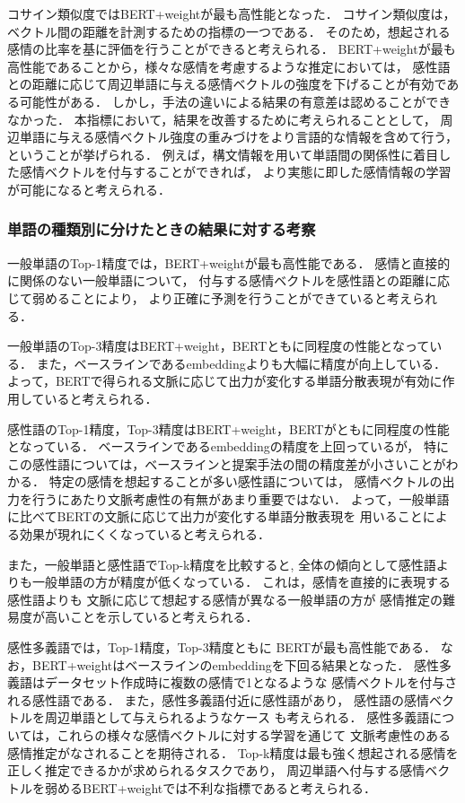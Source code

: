 			コサイン類似度ではBERT+weightが最も高性能となった．
			コサイン類似度は，ベクトル間の距離を計測するための指標の一つである．
			そのため，想起される感情の比率を基に評価を行うことができると考えられる．
			BERT+weightが最も高性能であることから，様々な感情を考慮するような推定においては，
			感性語との距離に応じて周辺単語に与える感情ベクトルの強度を下げることが有効である可能性がある．
			しかし，手法の違いによる結果の有意差は認めることができなかった．
			本指標において，結果を改善するために考えられることとして，
			周辺単語に与える感情ベクトル強度の重みづけをより言語的な情報を含めて行う，
			ということが挙げられる．
			例えば，構文情報を用いて単語間の関係性に着目した感情ベクトルを付与することができれば，
			より実態に即した感情情報の学習が可能になると考えられる．			
			
		\subsubsection{単語の種類別に分けたときの結果に対する考察}
			一般単語のTop-1精度では，BERT+weightが最も高性能である．
			感情と直接的に関係のない一般単語について，
			付与する感情ベクトルを感性語との距離に応じて弱めることにより，
			より正確に予測を行うことができていると考えられる．

			一般単語のTop-3精度はBERT+weight，BERTともに同程度の性能となっている．
			また，ベースラインであるembeddingよりも大幅に精度が向上している．
			よって，BERTで得られる文脈に応じて出力が変化する単語分散表現が有効に作用していると考えられる．

			感性語のTop-1精度，Top-3精度はBERT+weight，BERTがともに同程度の性能となっている．
			ベースラインであるembeddingの精度を上回っているが，
			特にこの感性語については，ベースラインと提案手法の間の精度差が小さいことがわかる．
			特定の感情を想起することが多い感性語については，
			感情ベクトルの出力を行うにあたり文脈考慮性の有無があまり重要ではない．
			よって，一般単語に比べてBERTの文脈に応じて出力が変化する単語分散表現を
			用いることによる効果が現れにくくなっていると考えられる．

			また，一般単語と感性語でTop-k精度を比較すると,
			全体の傾向として感性語よりも一般単語の方が精度が低くなっている．
			これは，感情を直接的に表現する感性語よりも
			文脈に応じて想起する感情が異なる一般単語の方が
			感情推定の難易度が高いことを示していると考えられる．

			感性多義語では，Top-1精度，Top-3精度ともに
			BERTが最も高性能である．
			なお，BERT+weightはベースラインのembeddingを下回る結果となった．
			感性多義語はデータセット作成時に複数の感情で1となるような
			感情ベクトルを付与される感性語である．
			また，感性多義語付近に感性語があり，
			感性語の感情ベクトルを周辺単語として与えられるようなケース
			も考えられる．
			感性多義語については，これらの様々な感情ベクトルに対する学習を通じて
			文脈考慮性のある感情推定がなされることを期待される．
			Top-k精度は最も強く想起される感情を正しく推定できるかが求められるタスクであり，
			周辺単語へ付与する感情ベクトルを弱めるBERT+weightでは不利な指標であると考えられる．
			

